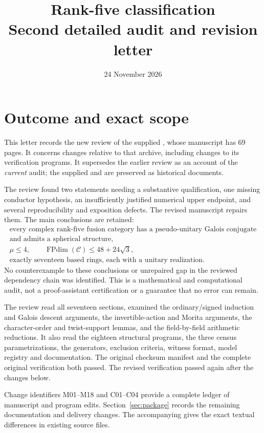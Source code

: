 \documentclass[11pt,a4paper]{article}
\title{Rank-five classification\\[4pt]\large Second detailed audit and revision letter}
\author{}
\date{24 November 2026}
\newcommand{\FPdim}{\operatorname{FPdim}}
\begin{document}
\maketitle

\section{Outcome and exact scope}

This letter records the new review of the supplied
, whose manuscript has 69 pages.
It concerns changes relative to that archive, including changes to its
verification programs. It supersedes the earlier review as an account of
the \emph{current} audit; the supplied  and
 are preserved as historical documents.

The review found two statements needing a substantive qualification,
one missing conductor hypothesis, an insufficiently justified numerical
upper endpoint, and several reproducibility and exposition defects.
The revised manuscript repairs them. The main conclusions are retained:
\[
\begin{gathered}
\text{every complex rank-five fusion category has a pseudo-unitary Galois
conjugate}\\[-2pt]
\text{and admits a spherical structure},\\
\mu\le4,\qquad \FPdim(\mathcal C)\le48+24\sqrt3,\\
\text{exactly seventeen based rings, each with a unitary realization}.
\end{gathered}
\]
No counterexample to these conclusions or unrepaired gap in the reviewed
dependency chain was identified. This is a mathematical and computational
audit, not a proof-assistant certification or a guarantee that no error
can remain.

The review read all seventeen sections, examined the ordinary/signed
induction and Galois descent arguments, the invertible-action and Morita
arguments, the character-order and twist-support lemmas, and the
field-by-field arithmetic reductions. It also read the eighteen structural
programs, the three census parametrizations, the generators, exclusion
criteria, witness format, model registry and documentation. The original
checksum manifest and the complete original verification both passed.
The revised verification passed again after the changes below.

Change identifiers M01--M18 and C01--C04 provide a complete ledger of
manuscript and program edits. Section~\ref{sec:package} records the
remaining documentation and delivery changes. The accompanying
 gives the exact textual differences in existing
source files.
\end{document}
